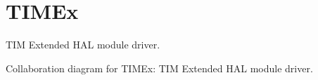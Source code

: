\hypertarget{group__TIMEx}{}\section{T\+I\+M\+Ex}
\label{group__TIMEx}


T\+IM Extended H\+AL module driver.  


Collaboration diagram for T\+I\+M\+Ex\+:
T\+IM Extended H\+AL module driver. 

